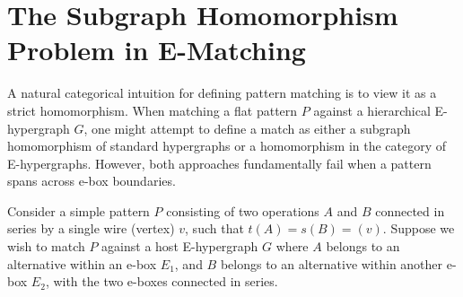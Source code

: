 \documentclass[11pt,a4paper]{article}
\theoremstyle{definition}
\theoremstyle{plain}
\begin{document}
\section{The Subgraph Homomorphism Problem in E-Matching}

A natural categorical intuition for defining pattern matching is to view it as a strict homomorphism. When matching a flat pattern $P$ against a hierarchical E-hypergraph $G$, one might attempt to define a match as either a subgraph homomorphism of standard hypergraphs or a homomorphism in the category of E-hypergraphs. However, both approaches fundamentally fail when a pattern spans across e-box boundaries.

Consider a simple pattern $P$ consisting of two operations $A$ and $B$ connected in series by a single wire (vertex) $v$, such that $t(A) = s(B) = (v)$. Suppose we wish to match $P$ against a host E-hypergraph $G$ where $A$ belongs to an alternative within an e-box $E_1$, and $B$ belongs to an alternative within another e-box $E_2$, with the two e-boxes connected in series.
\end{document}
